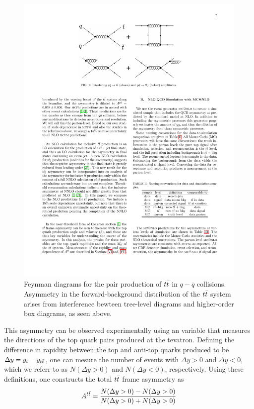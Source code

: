 \begin{figure}
  \begin{center}
    \includegraphics[width=125mm]{figures/theory/ttbarForwardBackwardFeynman}
  \end{center}
  \caption{Feynman diagrams for the pair production of $t\bar{t}$ in $q-\overline{q}$ collisions.  Asymmetry in the forward-background distribution of the $t\bar{t}$ system arises from interference bewteen tree-level diagrams and higher-order box diagrams, as seen above.}
  \label{img:ForwardBackwardFeynman}
\end{figure}

This asymmetry can be observed experimentally using an variable that measures the directions of the top quark pairs produced at the tevatron.
Defining the difference in rapidity between the top and anti-top quarks produced to be $\Delta y = y_{t} - y_{t\bar{t}}$, one can mesure the number of events with $\Delta y>0$ and $\Delta y<0$, which we referr to as $N(\Delta y>0)$ and $N(\Delta y < 0)$, respectively.
Using these definitions, one constructs the total $t\bar{t}$ frame asymmetry as
\begin{equation}
  A^{t\bar{t}} = \frac{N(\Delta y>0) - N(\Delta y>0)}{N(\Delta y>0) + N(\Delta y>0)}
\end{equation}


